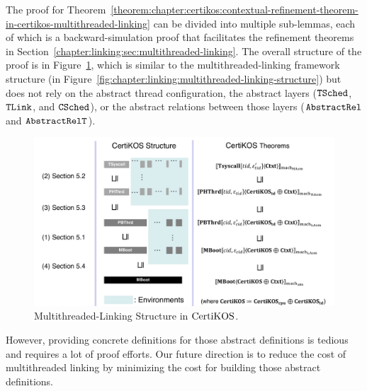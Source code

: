 The proof for Theorem~\ref{theorem:chapter:certikos:contextual-refinement-theorem-in-certikos-multithreaded-linking} 
can be divided into multiple sub-lemmas, each of which is a backward-simulation proof 
that facilitates the refinement theorems in Section~\ref{chapter:linking:sec:multithreaded-linking}. 
The overall structure of the proof is in Figure~\ref{fig:chapter:certikos:multithreaded-connect-proof-overall-structure}, which is 
similar to the multithreaded-linking framework structure (in Figure~\ref{fig:chapter:linking:multithreaded-linking-structure}) but does not rely on
the abstract thread configuration, the abstract layers (${{\mathrm{\texttt{TSched}}}}$, ${{\mathrm{\texttt{TLink}}}}$, and ${{\mathrm{\texttt{CSched}}}}$), or 
the abstract relations between those layers (${\mathrm{\texttt{AbstractRel}}}$ and ${\mathrm{\texttt{AbstractRelT}}}$).
\begin{figure}
\includegraphics[width=\textwidth, page=3]{figs/certikos/concurrent_linking}
\caption{Multithreaded-Linking Structure in $\mathrm{CertiKOS}$.}
\label{fig:chapter:certikos:multithreaded-connect-proof-overall-structure}
\end{figure}
However, providing concrete definitions for those abstract definitions is tedious and requires a lot of proof efforts. 
Our future direction is to reduce the cost of multithreaded linking by minimizing the cost for building 
those abstract definitions. 

%



